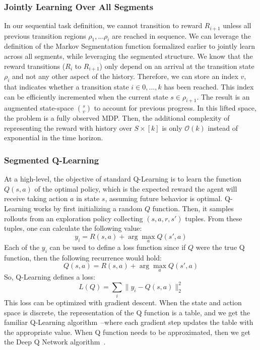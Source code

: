 \subsubsection{Jointly Learning Over All Segments}
In our sequential task definition, we cannot transition to reward $R_{i+1}$ unless all previous transition regions $\rho_{1},...\rho_{i}$ are reached in sequence.
We can leverage the definition of the Markov Segmentation function formalized earlier to jointly learn across all segments, while leveraging the segmented structure.
We know that the reward transitions ($R_{i}$ to $R_{i+1}$) only depend on an arrival at the transition state $\rho_{i}$ and not any other aspect of the history.
Therefore, we can store an index $v$, that indicates whether a transition state $i \in 0,...,k$ has been reached.
This index can be efficiently incremented when the current state $s \in \rho_{i+1}$.
The result is an augmented state-space $\binom{s}{v}$ to account for previous progress.
In this lifted space, the problem is a fully observed MDP.
Then, the additional complexity of representing the reward with history over $S \times  [k]$ is only $\mathcal{O}(k)$ instead of exponential in the time horizon.

\subsubsection{Segmented Q-Learning}
At a high-level, the objective of standard Q-Learning is to learn the function $Q(s,a)$ of the optimal policy, which is the expected reward the agent will receive taking action $a$ in state $s$, assuming future behavior is optimal. 
Q-Learning works by first initializing a random $Q$ function. Then, it samples rollouts from an exploration policy collecting $(s,a,r, s')$ tuples. From these tuples, one can calculate the following value:
\[
y_i = R(s,a) + \arg \max_{a} Q(s',a)
\]
Each of the $y_i$ can be used to define a loss function since if $Q$ were the true Q function, then the following recurrence would hold:
\[
Q(s,a) = R(s,a) + \arg \max_{a} Q(s',a)
\]
So, Q-Learning defines a loss:
\[
L(Q) = \sum_{i} \|y_i - Q(s,a)\|_2^2
\]
This loss can be optimized with gradient descent. When the state and action space is discrete, the representation of the Q function is a table, and we get the familiar Q-Learning algorithm~\cite{sutton1998reinforcement}--where each gradient step updates the table with the appropriate value. When Q function needs to be approximated, then we get the Deep Q Network algorithm~\cite{mnih2015human}.

